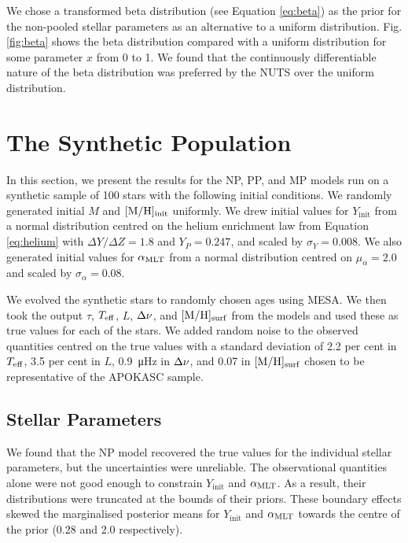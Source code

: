 We chose a transformed beta distribution (see Equation \ref{eq:beta}) as the prior for the non-pooled stellar parameters as an alternative to a uniform distribution. Fig. \ref{fig:beta} shows the beta distribution compared with a uniform distribution for some parameter $x$ from 0 to 1. We found that the continuously differentiable nature of the beta distribution was preferred by the NUTS over the uniform distribution.

\section{The Synthetic Population}\label{sec:test-stars}



In this section, we present the results for the NP, PP, and MP models run on a synthetic sample of 100 stars with the following initial conditions. We randomly generated initial $M$ and $[\mathrm{M}/\mathrm{H}]_\mathrm{init}$ uniformly. We drew initial values for $Y_\mathrm{init}$ from a normal distribution centred on the helium enrichment law from Equation \ref{eq:helium} with $\Delta Y / \Delta Z = 1.8$ and $Y_P = 0.247$, and scaled by $\sigma_Y = 0.008$. We also generated initial values for ${\alpha_\mathrm{MLT}}$ from a normal distribution centred on $\mu_\alpha = 2.0$ and scaled by $\sigma_\alpha = 0.08$.

We evolved the synthetic stars to randomly chosen ages using \textsc{MESA}. We then took the output $\tau$, ${T_\mathrm{eff}}$, $L$, ${\Delta\nu}$, and $[\mathrm{M}/\mathrm{H}]_\mathrm{surf}$ from the models and used these as true values for each of the stars. We added random noise to the observed quantities centred on the true values with a standard deviation of 2.2 per cent in ${T_\mathrm{eff}}$, 3.5 per cent in $L$, \SI{0.9}{\micro\hertz} in ${\Delta\nu}$, and \SI{0.07}{\dex} in $[\mathrm{M}/\mathrm{H}]_\mathrm{surf}$ chosen to be representative of the APOKASC sample.

\subsection{Stellar Parameters}

We found that the NP model recovered the true values for the individual stellar parameters, but the uncertainties were unreliable. The observational quantities alone were not good enough to constrain $Y_\mathrm{init}$ and ${\alpha_\mathrm{MLT}}$. As a result, their distributions were truncated at the bounds of their priors. These boundary effects skewed the marginalised posterior means for $Y_\mathrm{init}$ and ${\alpha_\mathrm{MLT}}$ towards the centre of the prior (0.28 and 2.0 respectively).

